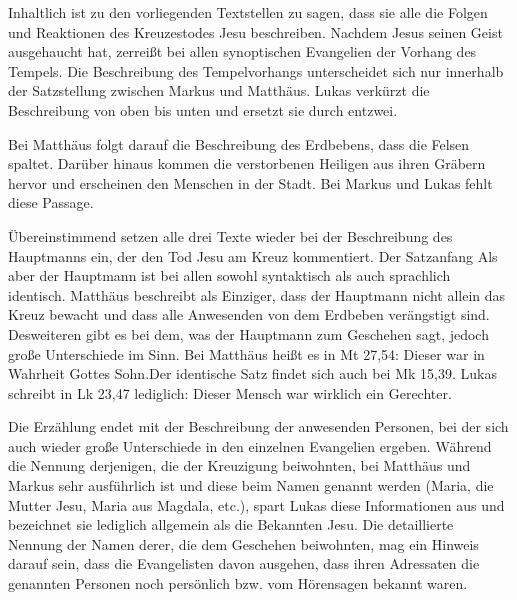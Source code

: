 Inhaltlich ist zu den vorliegenden Textstellen zu sagen, dass sie alle die Folgen und Reaktionen des Kreuzestodes Jesu beschreiben. Nachdem Jesus seinen Geist ausgehaucht hat, zerreißt bei allen synoptischen Evangelien der Vorhang des Tempels. Die Beschreibung des Tempelvorhangs unterscheidet sich nur innerhalb der Satzstellung zwischen Markus und Matthäus. Lukas verkürzt die Beschreibung \glqq von oben bis unten \grqq  und ersetzt sie durch \glqq entzwei\grqq.

Bei Matthäus folgt darauf die Beschreibung des Erdbebens, dass die Felsen spaltet. Darüber hinaus kommen die verstorbenen Heiligen aus ihren Gräbern hervor und erscheinen den Menschen in der Stadt. Bei Markus und Lukas fehlt diese Passage.

Übereinstimmend setzen alle drei Texte wieder bei der Beschreibung des Hauptmanns ein, der den Tod Jesu am Kreuz kommentiert. Der Satzanfang \glqq Als aber der Hauptmann \grqq ist bei allen sowohl syntaktisch als auch sprachlich identisch. Matthäus beschreibt als Einziger, dass der Hauptmann nicht allein das Kreuz bewacht und dass alle Anwesenden von dem Erdbeben verängstigt sind. Desweiteren gibt es bei dem, was der Hauptmann zum Geschehen sagt, jedoch große Unterschiede im Sinn. Bei Matthäus heißt es in Mt 27,54: \glqq Dieser war in Wahrheit Gottes Sohn.\grqq Der identische Satz findet sich auch bei Mk 15,39. Lukas schreibt in Lk 23,47 lediglich: \glqq Dieser Mensch war wirklich ein Gerechter.\grqq

Die Erzählung endet mit der Beschreibung der anwesenden Personen, bei der sich auch wieder große Unterschiede in den einzelnen Evangelien ergeben. Während die Nennung derjenigen, die der Kreuzigung beiwohnten, bei Matthäus und Markus sehr ausführlich ist und diese beim Namen genannt werden (Maria, die Mutter Jesu,  Maria aus Magdala, etc.), spart Lukas diese Informationen aus und bezeichnet sie lediglich allgemein als die \glqq Bekannten \grqq Jesu.  Die detaillierte Nennung der Namen derer, die dem Geschehen beiwohnten, mag ein Hinweis darauf sein, dass die Evangelisten davon ausgehen, dass ihren Adressaten die genannten Personen noch persönlich bzw. vom Hörensagen bekannt waren.
